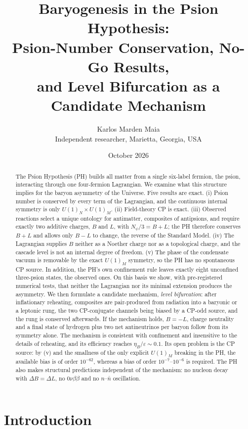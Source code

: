 \documentclass[11pt]{article}
\title{Baryogenesis in the Psion Hypothesis:\\
Psion-Number Conservation, No-Go Results,\\
and Level Bifurcation as a Candidate Mechanism}
\author{Karlos Marden Maia\\ \small Independent researcher, Marietta, Georgia, USA}
\date{October 2026}
\newcommand{\Np}{N_\psi}
\begin{document}
\maketitle

\begin{abstract}
The Psion Hypothesis (PH) builds all matter from a single six-label fermion, the psion, interacting through one four-fermion Lagrangian. We examine what this structure implies for the baryon asymmetry of the Universe. Five results are exact. (i) Psion number is conserved by every term of the Lagrangian, and the continuous internal symmetry is only $U(1)_N\times U(1)_M$. (ii) Field-theory CP is exact. (iii) Observed reactions select a unique ontology for antimatter, composites of antipsions, and require exactly two additive charges, $B$ and $L$, with $\Np/3=B+L$; the PH therefore conserves $B+L$ and allows only $B-L$ to change, the reverse of the Standard Model. (iv) The Lagrangian supplies $B$ neither as a Noether charge nor as a topological charge, and the cascade level is not an internal degree of freedom. (v) The phase of the condensate vacuum is removable by the exact $U(1)_M$ symmetry, so the PH has no spontaneous CP source. In addition, the PH's own confinement rule leaves exactly eight unconfined three-psion states, the observed ones. On this basis we show, with pre-registered numerical tests, that neither the Lagrangian nor its minimal extension produces the asymmetry. We then formulate a candidate mechanism, \emph{level bifurcation}: after inflationary reheating, composites are pair-produced from radiation into a baryonic or a leptonic rung, the two CP-conjugate channels being biased by a CP-odd source, and the rung is conserved afterwards. If the mechanism holds, $B=-L$, charge neutrality and a final state of hydrogen plus two net antineutrinos per baryon follow from its symmetry alone. The mechanism is consistent with confinement and insensitive to the details of reheating, and its efficiency reaches $\eta_B/\varepsilon\sim0.1$. Its open problem is the CP source: by (v) and the smallness of the only explicit $U(1)_M$ breaking in the PH, the available bias is of order $10^{-62}$, whereas a bias of order $10^{-7}$--$10^{-6}$ is required. The PH also makes structural predictions independent of the mechanism: no nucleon decay with $\Delta B=\Delta L$, no $0\nu\beta\beta$ and no $n$--$\bar n$ oscillation.
\end{abstract}

\section{Introduction}
\end{document}
